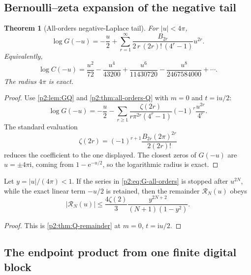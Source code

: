 \documentclass[11pt,oneside]{article}
\numberwithin{equation}{section}
\newtheorem{theorem}{Theorem}[section]
\theoremstyle{definition}
\theoremstyle{remark}
\newcommand{\e}{\mathrm e}
\newcommand{\ii}{\mathrm i}
\begin{document}
\subsection{Bernoulli--zeta expansion of the negative tail}

\begin{theorem}[All-orders negative-Laplace tail]
\label{p2:thm:G-all-orders}
For $|u|<4\pi$,
\begin{equation}
 \boxed{
 \log G(-u)
 =-\frac{u}{2}
 +\sum_{r=1}^{\infty}
 \frac{B_{2r}}{2\,r\,(2r)!\,(4^r-1)}u^{2r}.}
 \label{p2:eq:G-all-orders}
\end{equation}
Equivalently,
\begin{equation}
 \log C(-u)
 =\frac{u^2}{72}-\frac{u^4}{43200}
  +\frac{u^6}{11430720}-\frac{u^8}{2467584000}+\cdots.
 \label{p2:eq:C-first}
\end{equation}
The radius $4\pi$ is exact.
\newresult
\end{theorem}

\begin{proof}
Use \cref{p2:lem:GQ} and \cref{p2:thm:all-orders-Q} with $m=0$ and $t=\ii u/2$:
\[
 \log G(-u)=-\frac u2
 -\sum_{r\ge1}\frac{\zeta(2r)}{r\pi^{2r}(4^r-1)}
 (-1)^r\frac{u^{2r}}{4^r}.
\]
The standard evaluation
\[
 \zeta(2r)=(-1)^{r+1}\frac{B_{2r}(2\pi)^{2r}}{2(2r)!}
\]
reduces the coefficient to the one displayed.  The closest zeros of $G(-u)$ are
$u=\pm4\pi\ii$, coming from $1-\e^{-u/2}$, so the logarithmic radius is exact.
\end{proof}

\begin{corollary}
\label{p2:cor:G-remainder}
Let $y=|u|/(4\pi)<1$.  If the series in \eqref{p2:eq:G-all-orders} is stopped after $u^{2N}$,
while the exact linear term $-u/2$ is retained, then the remainder $\mathcal R_N(u)$ obeys
\begin{equation}
 |\mathcal R_N(u)|
 \le \frac{4\zeta(2)}{3}
 \frac{y^{2N+2}}{(N+1)(1-y^2)}.
 \label{p2:eq:G-rem}
\end{equation}
\end{corollary}

\begin{proof}
This is \cref{p2:thm:Q-remainder} at $m=0$, $t=\ii u/2$.
\end{proof}

\subsection{The endpoint product from one finite digital block}
\end{document}
